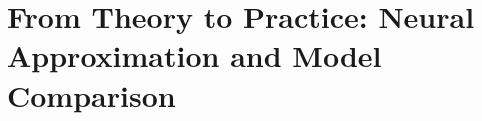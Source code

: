 
\chapter{From Theory to Practice: Neural Approximation and Model Comparison}
\label{chap:model_comparison}










